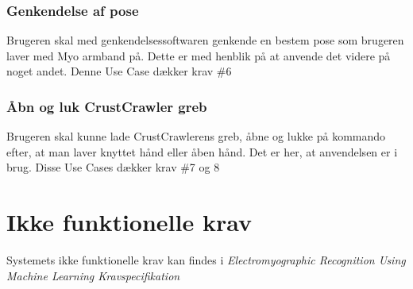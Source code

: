\subsubsection{Genkendelse af pose}
Brugeren skal med genkendelsessoftwaren genkende en bestem pose som brugeren laver med Myo armband på. Dette er med henblik på at anvende det videre på noget andet. Denne Use Case dækker krav \#6
\subsubsection{Åbn og luk CrustCrawler greb}
Brugeren skal kunne lade CrustCrawlerens greb, åbne og lukke på kommando efter, at man laver knyttet hånd eller åben hånd. Det er her, at anvendelsen er i brug. Disse Use Cases dækker krav \#7 og 8

\section{Ikke funktionelle krav}
\label{sec:ikkefunktionellekrav}
Systemets ikke funktionelle krav kan findes i \textit{Electromyographic Recognition Using Machine Learning Kravspecifikation}\citep{RefWorks:8}